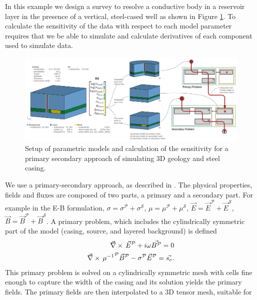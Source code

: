 In this example we design a survey to resolve a conductive body in
a reservoir layer in the presence of a vertical, steel-cased well as shown in
Figure \ref{fig:parametricCasing}. To calculate the sensitivity of the data
with respect to each model parameter requires that we be able to simulate and
calculate derivatives of each component used to simulate data.

{%
\begin{figure}[htb!]
    \centering
    \includegraphics[width=\textwidth]{images/simpegEMexamples-07.png}
\caption{Setup of parametric models and calculation of the sensitivity for a primary secondary approach of simulating 3D geology and steel casing.}
\label{fig:parametricCasing}
\end{figure}
}
We use a primary-secondary approach, as described in \cite{Heagy2015}. The
physical properties, fields and fluxes are composed of two
parts, a primary and a secondary part. For example in the E-B formulation, $\sigma
=\sigma^{\mathcal{P}} + \sigma^{\mathcal{S}}$, $\mu =\mu^{\mathcal{P}} +
\mu^{\mathcal{S}}$, $\vec{E} = \vec{E}^{\mathcal{P}} + \vec{E}^{\mathcal{S}}$,
$\vec{B} = \vec{B}^{\mathcal{P}} + \vec{B}^{\mathcal{S}}$. A primary problem,
which includes the cylindrically symmetric part of the model (casing, source, and
layered background) is defined
\begin{equation}
\begin{split}
    {\vec \nabla}\times\, \vec{E}^{\mathcal{P}} + i \omega \vec{B^{\mathcal{P}}} = 0 \\
    {\vec \nabla}\times\, {\mu^{-1}}^{\mathcal{P}} \vec{B}^{\mathcal{P}} - \sigma^{\mathcal{P}}  \vec{E}^{\mathcal{P}} = \vec{s_e}.
\end{split}
\label{eq:primary}
\end{equation}
This primary problem is solved on a cylindrically symmetric mesh with cells
fine enough to capture the width of the casing and its solution yields the primary fields. The
primary fields are then interpolated to a 3D tensor mesh, suitable for
